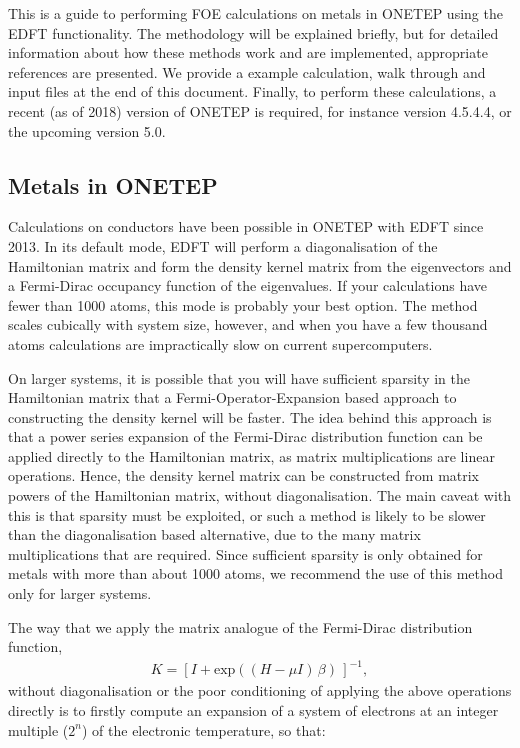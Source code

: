 \documentclass[letterpaper,10pt,english]{sphinxmanual}
\begin{document}
This is a guide to performing FOE calculations on metals in ONETEP using
the EDFT functionality. The methodology will be explained briefly, but
for detailed information about how these methods work and are
implemented, appropriate references are presented. We provide a example
calculation, walk through and input files at the end of this document.
Finally, to perform these calculations, a recent (as of 2018) version of
ONETEP is required, for instance version 4.5.4.4, or the upcoming
version 5.0.


\subsection{Metals in ONETEP}
\label{\detokenize{AQUA-FOE:metals-in-onetep}}
Calculations on conductors have been possible in ONETEP with EDFT since
2013. In its default mode, EDFT will perform a diagonalisation of the
Hamiltonian matrix and form the density kernel matrix from the
eigenvectors and a Fermi-Dirac occupancy function of the eigenvalues. If
your calculations have fewer than 1000 atoms, this mode is probably your
best option. The method scales cubically with system size, however, and
when you have a few thousand atoms calculations are impractically slow
on current supercomputers.

On larger systems, it is possible that you will have sufficient sparsity
in the Hamiltonian matrix that a Fermi-Operator-Expansion based approach
to constructing the density kernel will be faster. The idea behind this
approach is that a power series expansion of the Fermi-Dirac
distribution function can be applied directly to the Hamiltonian matrix,
as matrix multiplications are linear operations. Hence, the density
kernel matrix can be constructed from matrix powers of the Hamiltonian
matrix, without diagonalisation. The main caveat with this is that
sparsity must be exploited, or such a method is likely to be slower than
the diagonalisation based alternative, due to the many matrix
multiplications that are required. Since sufficient sparsity is only
obtained for metals with more than about 1000 atoms, we recommend the
use of this method only for larger systems.

The way that we apply the matrix analogue of the Fermi-Dirac
distribution function,
\begin{equation*}
\begin{split}K=[I+\mathrm{exp}((H-\mu I)\,\beta)\,]^{-1},\end{split}
\end{equation*}
without diagonalisation or the poor conditioning of applying the above
operations directly is to firstly compute an expansion of a system of
electrons at an integer multiple (\(2^n\)) of the electronic
temperature, so that:
\end{document}
